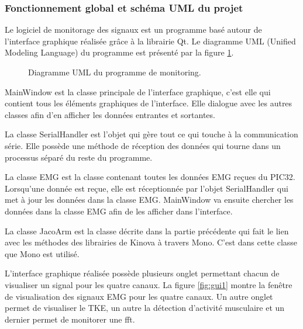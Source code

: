 \documentclass[letterpaper, twoside, 12pt, memoire, creativecommons, hyperref]{thETS}
\begin{document}
\subsubsection{Fonctionnement global et schéma UML du projet}

Le logiciel de monitorage des signaux est un programme basé autour de l'interface graphique réalisée grâce à la librairie Qt. Le diagramme UML (Unified Modeling Language) du programme est présenté par la figure \ref{fig:uml}.

\begin{figure}
	\centering
	\caption{Diagramme UML du programme de monitoring.}
	\label{fig:uml}
\end{figure}

MainWindow est la classe principale de l'interface graphique, c'est elle qui contient tous les éléments graphiques de l'interface. Elle dialogue avec les autres classes afin d'en afficher les données entrantes et sortantes. 

La classe SerialHandler est l'objet qui gère tout ce qui touche à la communication série. Elle possède une méthode de réception des données qui tourne dans un processus séparé du reste du programme.

La classe EMG est la classe contenant toutes les données EMG reçues du PIC32. Lorsqu'une donnée est reçue, elle est réceptionnée par l'objet SerialHandler qui met à jour les données dans la classe EMG. MainWindow va ensuite chercher les données dans la classe EMG afin de les afficher dans l'interface. 

La classe JacoArm est la classe décrite dans la partie précédente qui fait le lien avec les méthodes des librairies de Kinova à travers Mono. C'est dans cette classe que Mono est utilisé.

L'interface graphique réalisée possède plusieurs onglet permettant chacun de visualiser un signal pour les quatre canaux. La figure \ref{fig:gui1} montre la fenêtre de visualisation des signaux EMG pour les quatre canaux. Un autre onglet permet de visualiser le TKE, un autre la détection d'activité musculaire et un dernier permet de monitorer une fft. 
\end{document}
